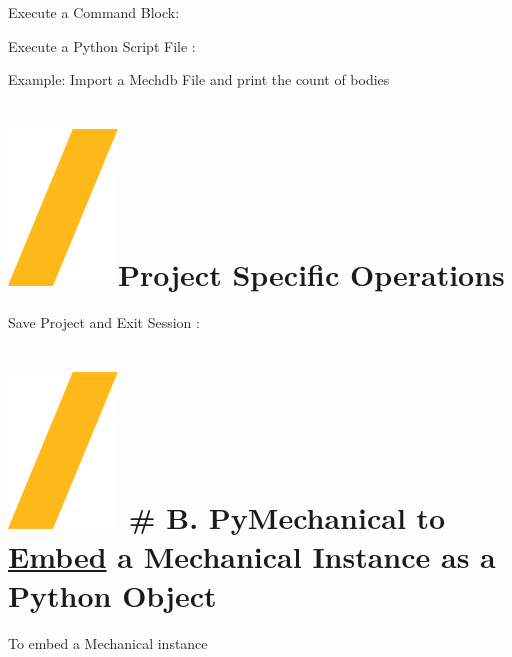 \documentclass[9pt,landscape]{article}
\begin{document}
\begin{multicols}{3}

Execute a Command Block:


Execute a Python Script File :


Example: Import a Mechdb File and print the count of bodies



\vfill
\section{\includegraphics[height=\fontcharht\font`\S]{slash.png}Project Specific Operations}
Save Project and Exit Session :


\section{\includegraphics[height=\fontcharht\font`\S]{slash.png} # B. PyMechanical to \underline{Embed}  a Mechanical Instance as a Python Object}
\vspace{5mm} %

To embed a Mechanical instance


\end{multicols}
\end{document}

